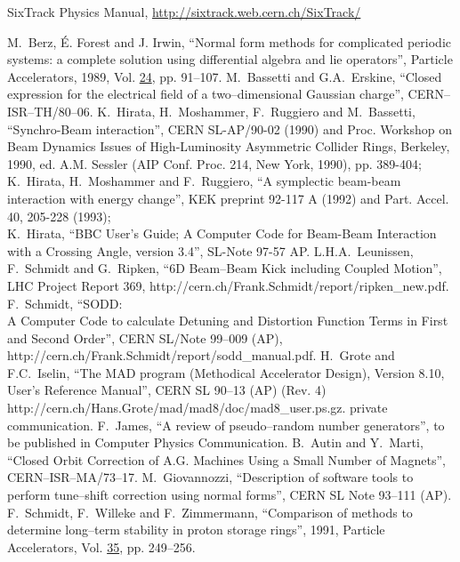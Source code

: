 \documentclass[a4paper,11pt]{report}
\begin{document}
\begin{thebibliography}{99}
 SixTrack Physics Manual, \url{http://sixtrack.web.cern.ch/SixTrack/}

%
 M.~Berz, \'{E}. Forest
  and J. Irwin, ``Normal form methods for complicated periodic
  systems: a complete solution using differential algebra and lie
  operators'', Particle Accelerators, 1989, Vol. \underline{24}, pp.
  91--107.  
%
 M.~Bassetti and G.A.~Erskine,
  ``Closed expression for the electrical field of a two--dimensional
  Gaussian charge'', CERN--ISR--TH/80--06.  
%
 K.~Hirata, H.~Moshammer, F.~Ruggiero and M.~Bassetti,
  ``Synchro-Beam interaction'', CERN SL-AP/90-02 (1990) and Proc.
  Workshop on Beam Dynamics Issues of High-Luminosity Asymmetric
  Collider Rings, Berkeley, 1990, ed. A.M. Sessler (AIP Conf.  Proc.
  214, New York, 1990), pp. 389-404;\\
  K.~Hirata, H.~Moshammer and F.~Ruggiero, ``A symplectic beam-beam
  interaction with energy change'', KEK preprint 92-117 A (1992) and
  Part. Accel. 40, 205-228 (1993);\\
  K.~Hirata, ``BBC User's Guide; A Computer Code for Beam-Beam Interaction 
  with a Crossing Angle, version 3.4'', SL-Note 97-57 AP.
%
 L.H.A.~Leunissen, F.~Schmidt and G.~Ripken, ``6D
  Beam--Beam Kick including Coupled Motion'', LHC Project Report 369,
  {http://cern.ch/Frank.Schmidt/report/ripken\_new.pdf}.
%
 F.~Schmidt, ``SODD:\\ A Computer Code to calculate
  Detuning and Distortion Function Terms in First and Second Order'',
  CERN SL/Note 99--009 (AP),
  {http://cern.ch/Frank.Schmidt/report/sodd\_manual.pdf}.
%
  H.~Grote and F.C.~Iselin, ``The MAD program (Methodical Accelerator
  Design), Version 8.10, User's Reference Manual'', CERN SL 90--13
  (AP) (Rev. 4)\\
  {http://cern.ch/Hans.Grote/mad/mad8/doc/mad8\_user.ps.gz}.
%
 private communication.  
%
 F.~James, ``A review of
  pseudo--random number generators'', to be published in Computer
  Physics Communication.  
%
 B.~Autin and Y.~Marti, ``Closed Orbit Correction of
  A.G. Machines Using a Small Number of Magnets'',
  CERN--ISR--MA/73--17.
%
 M.~Giovannozzi,
  ``Description of software tools to perform tune--shift correction
  using normal forms'', CERN SL Note 93--111 (AP).
%
 F.~Schmidt, F.~Willeke and F.~Zimmermann,
  ``Comparison of methods to determine long--term stability in proton
  storage rings'', 1991, Particle Accelerators, Vol. \underline{35},
  pp. 249--256.  


\end{thebibliography}
\end{document}
